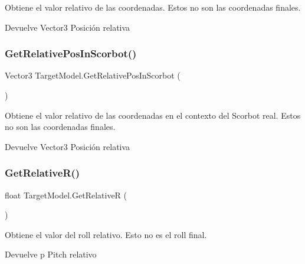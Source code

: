 Obtiene el valor relativo de las coordenadas. Estos no son las coordenadas finales. \begin{DoxyReturn}{Devuelve}
Vector3 Posición relativa 
\end{DoxyReturn}
\mbox{\label{class_target_model_ac404e12af9eaccea8afd07b0fe3d638e}} 
\subsubsection{\texorpdfstring{GetRelativePosInScorbot()}{GetRelativePosInScorbot()}}
{\footnotesize\ttfamily Vector3 Target\+Model.\+Get\+Relative\+Pos\+In\+Scorbot (\begin{DoxyParamCaption}{ }\end{DoxyParamCaption})\hspace{0.3cm}{\ttfamily [inline]}}

Obtiene el valor relativo de las coordenadas en el contexto del Scorbot real. Estos no son las coordenadas finales. \begin{DoxyReturn}{Devuelve}
Vector3 Posición relativa 
\end{DoxyReturn}
\mbox{\label{class_target_model_ae564153ce4906bd59461949b2531b5ff}} 
\subsubsection{\texorpdfstring{GetRelativeR()}{GetRelativeR()}}
{\footnotesize\ttfamily float Target\+Model.\+Get\+RelativeR (\begin{DoxyParamCaption}{ }\end{DoxyParamCaption})\hspace{0.3cm}{\ttfamily [inline]}}

Obtiene el valor del roll relativo. Esto no es el roll final. \begin{DoxyReturn}{Devuelve}
p Pitch relativo 
\end{DoxyReturn}
\mbox{\label{class_target_model_a601f2538a41b5bdaba72c3f81d820710}} 
